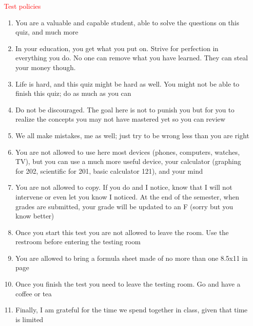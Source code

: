 \documentclass[cover.tex]{subfiles}
\begin{document}
 


\begin{mdframed}[style=MyFrame]
\begin{center}{\textcolor{red}{\Large Test policies}}\end{center}
\begin{enumerate}


\item	You are a valuable and capable student, able to solve the questions on this quiz, and much more
\item	In your education, you get what you put on. Strive for perfection in everything you do. No one can remove what you have learned. They can steal your money though.
\item	Life is hard, and this quiz might be hard as well. You might not be able to finish this quiz; do as much as you can
\item	Do not be discouraged. The goal here is not to punish you but for you to realize the concepts you may not have mastered yet so you can review 
\item	We all make mistakes, me as well; just try to be wrong less than you are right 
\item	You are not allowed to use here most devices (phones, computers, watches, TV), but you can use a much more useful device, your calculator (graphing for 202, scientific for 201, basic calculator 121), and your mind
\item	You are not allowed to copy. If you do and I notice, know that I will not intervene or even let you know I noticed. At the end of the semester, when grades are submitted, your grade will be updated to an F (sorry but you know better)
\item	Once you start this test you are not allowed to leave the room. Use the restroom before entering the testing room
\item	You are allowed to bring a formula sheet made of no more than one 8.5x11 in page
\item Once you finish the test you need to leave the testing room. Go and have a coffee or tea
\item	Finally, I am grateful for the time we spend together in class, given that time is limited


\end{enumerate}

    \par\noindent\makebox[1.5in]{\hrulefill}   \hfill\makebox[2.0in]{\hrulefill}    \hfill\makebox[2.0in]{\hrulefill}  \par\noindent{}    \hfill{}   \hfill{} 

\end{mdframed}
\end{document}

